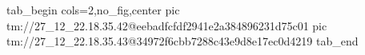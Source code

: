  
 
 
 
 

\qqSecOrig


\ifcmt
  tab_begin cols=2,no_fig,center
    pic tm://27_12_22.18.35.42@eebadfcfdf2941e2a384896231d75c01
    pic tm://27_12_22.18.35.43@34972f6cbb7288c43e9d8e17ec0d4219
  tab_end
\fi

